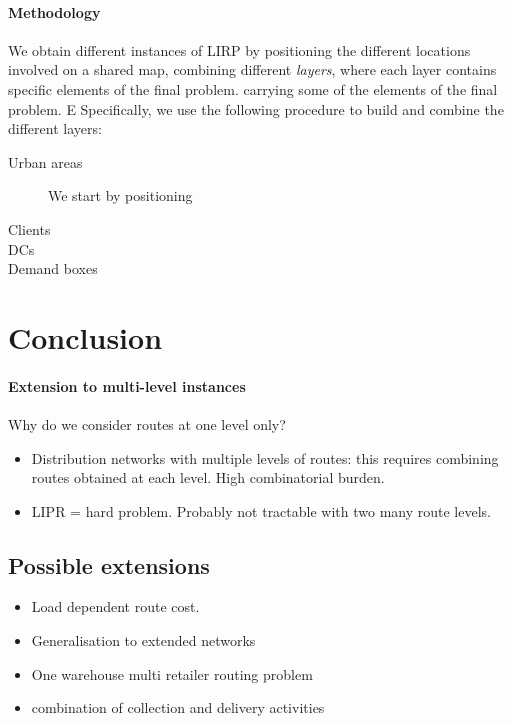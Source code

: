 \documentclass[a4paper,10pt]{article}
\begin{document}
\begin{linenumbers}
\paragraph{Methodology}
We obtain different instances of LIRP by positioning the different locations involved on a shared map, combining different {\em layers}, where each layer contains specific elements of the final problem.
carrying some of the elements of the final problem.
E
Specifically, we use the following procedure to build and combine the different layers:
\begin{description}
    \item[Urban areas] We start by positioning
    \item[Clients]
    \item[DCs]
    \item[Demand boxes]
\end{description}



\section{Conclusion}

\paragraph{Extension to multi-level instances}

Why do we consider routes at one level only? 

\begin{itemize}
	\item Distribution networks with multiple levels of routes: this requires combining routes obtained at each level. High combinatorial burden. 
	\item LIPR = hard problem. Probably not tractable with two many route levels. 
\end{itemize}





\subsection*{Possible extensions}
\begin{itemize}
	\item Load dependent route cost. 
	\item Generalisation to extended networks
	\item One warehouse multi retailer routing problem
	\item combination of collection and delivery activities
	
\end{itemize}


\end{linenumbers}

\newpage
%


\end{document}
